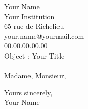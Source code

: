 \documentclass[10pt]{article}
\begin{document}
    \raggedright Your Name\\
    Your Institution\\ 
    65 rue de Richelieu\\
    your.name@yourmail.com\\
    00.00.00.00.00\\
    \vspace{0.5cm}
    Object : Your Title\\
    \hrulefill
    \vspace{0.3cm}\\
    
    \justifying Madame, Monsieur,
    \vspace{0.3cm}
    
    \lipsum[1-2]
    
    \vspace{0.2cm}
    \lipsum[1-2]
    
    \vspace{0.2cm}
    \lipsum[1]
   \vspace{0.2cm}

    \raggedright Yours sincerely,
    \vspace{0.5cm}\\
    \raggedleft Your Name
    
    
\end{document}
